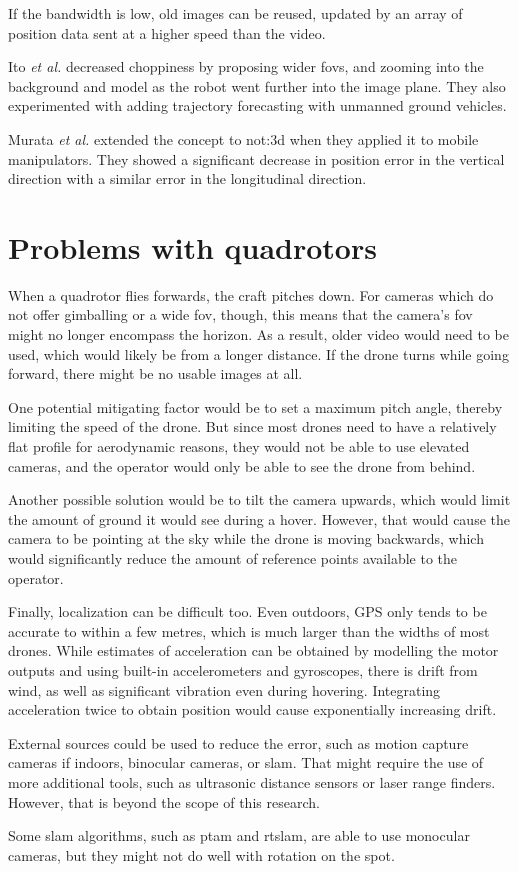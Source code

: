 If the bandwidth is low, old images can be reused, updated by an array of position data sent at a higher speed than the video.

Ito \emph{et al.} decreased choppiness by proposing wider \glspl{fov}, and zooming into the background and model as the robot went further into the image plane.\cite{ito2008} They also experimented with adding trajectory forecasting with unmanned ground vehicles.

Murata \emph{et al.} extended the concept to \gls{not:3d} when they applied it to mobile manipulators.\cite{murata2014}
They showed a significant decrease in position error in the vertical direction with a similar error in the longitudinal direction.

\section{Problems with quadrotors}
When a quadrotor flies forwards, the craft pitches down.
For cameras which do not offer gimballing or a wide \gls{fov}, though, this means that the camera's \gls{fov} might no longer encompass the horizon.
As a result, older video would need to be used, which would likely be from a longer distance.
If the drone turns while going forward, there might be no usable images at all.

One potential mitigating factor would be to set a maximum pitch angle, thereby limiting the speed of the drone.
But since most drones need to have a relatively flat profile for aerodynamic reasons, they would not be able to use elevated cameras, and the operator would only be able to see the drone from behind.

Another possible solution would be to tilt the camera upwards, which would limit the amount of ground it would see during a hover.
However, that would cause the camera to be pointing at the sky while the drone is moving backwards, which would significantly reduce the amount of reference points available to the operator.

Finally, localization can be difficult too.
Even outdoors, GPS only tends to be accurate to within a few metres, which is much larger than the widths of most drones.
While estimates of acceleration can be obtained by modelling the motor outputs and using built-in accelerometers and gyroscopes, there is drift from wind, as well as significant vibration even during hovering.
Integrating acceleration twice to obtain position would cause exponentially increasing drift.

External sources could be used to reduce the error, such as motion capture cameras if indoors, binocular cameras, or \gls{slam}.
That might require the use of more additional tools, such as ultrasonic distance sensors or laser range finders.
However, that is beyond the scope of this research.

Some \gls{slam} algorithms, such as \gls{ptam} and \gls{rtslam}, are able to use monocular cameras, but they might not do well with rotation on the spot.
